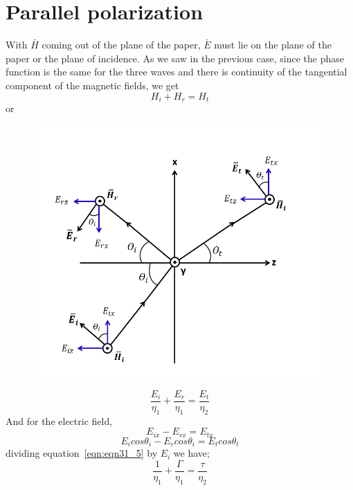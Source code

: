 \section{Parallel polarization}
With $\bar{H}$ coming out of the plane of the paper, $\bar{E}$ must lie on the plane of the paper or the plane of incidence. As we saw in the previous case, since the phase function is the same for the three waves and there is continuity of the tangential component of the magnetic fields, we get
\begin{equation*}
H_{i} + H_{r} = H_{t}
\end{equation*}
or
\begin{figure}[h]
\centering
\includegraphics[width=1.2\linewidth]{graphics/parallel_polarization1}
\caption{}
\label{fig:15}
\end{figure}
\begin{equation}
\frac{E_{i}}{\eta_{1}} + \frac{E_{r}}{\eta_{1}} = \frac{E_{t}}{\eta_{2}}
\label{eqn:eqn31_5}
\end{equation}
And for the electric field,
\begin{equation*}
E_{ix} - E_{rx} = E_{tx}
\end{equation*}
\begin{equation}
E_{i} cos\theta_{i} - E_{r} cos\theta_{i} = E_{t} cos\theta_{t}
\label{eqn:eqn31_6}
\end{equation}
dividing equation~\ref{eqn:eqn31_5} by $E_{i}$ we have;
\begin{equation}
\frac{1}{\eta_{1}} + \frac{\Gamma}{\eta_{1}} = \frac{\tau}{\eta_{2}}
\label{eqn:eqn31_7}
\end{equation}
